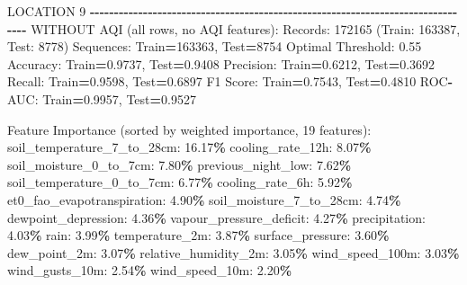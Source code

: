 \documentclass[
  letterpaper,
  DIV=11,
  numbers=noendperiod]{scrartcl}
\newenvironment{Shaded}{\begin{snugshade}}{\end{snugshade}}
\newcommand{\BuiltInTok}[1]{#1}
\newcommand{\DecValTok}[1]{\textcolor[rgb]{0.00,0.00,0.81}{#1}}
\newcommand{\FloatTok}[1]{\textcolor[rgb]{0.00,0.00,0.81}{#1}}
\newcommand{\NormalTok}[1]{#1}
\newcommand{\OperatorTok}[1]{\textcolor[rgb]{0.81,0.36,0.00}{\textbf{#1}}}
\begin{document}
\begin{Shaded}
\begin{Highlighting}[]
\NormalTok{LOCATION }\DecValTok{9}
\OperatorTok{{-}{-}{-}{-}{-}{-}{-}{-}{-}{-}{-}{-}{-}{-}{-}{-}{-}{-}{-}{-}{-}{-}{-}{-}{-}{-}{-}{-}{-}{-}{-}{-}{-}{-}{-}{-}{-}{-}{-}{-}{-}{-}{-}{-}{-}{-}{-}{-}{-}{-}{-}{-}{-}{-}{-}{-}{-}{-}{-}{-}{-}{-}{-}{-}{-}{-}{-}{-}{-}{-}{-}{-}{-}{-}{-}{-}{-}{-}{-}{-}}
\NormalTok{WITHOUT AQI (}\BuiltInTok{all}\NormalTok{ rows, no AQI features):}
\NormalTok{  Records: }\DecValTok{172165}\NormalTok{ (Train: }\DecValTok{163387}\NormalTok{, Test: }\DecValTok{8778}\NormalTok{)}
\NormalTok{  Sequences: Train}\OperatorTok{=}\DecValTok{163363}\NormalTok{, Test}\OperatorTok{=}\DecValTok{8754}
\NormalTok{  Optimal Threshold: }\FloatTok{0.55}
\NormalTok{  Accuracy: Train}\OperatorTok{=}\FloatTok{0.9737}\NormalTok{, Test}\OperatorTok{=}\FloatTok{0.9408}
\NormalTok{  Precision: Train}\OperatorTok{=}\FloatTok{0.6212}\NormalTok{, Test}\OperatorTok{=}\FloatTok{0.3692}
\NormalTok{  Recall: Train}\OperatorTok{=}\FloatTok{0.9598}\NormalTok{, Test}\OperatorTok{=}\FloatTok{0.6897}
\NormalTok{  F1 Score: Train}\OperatorTok{=}\FloatTok{0.7543}\NormalTok{, Test}\OperatorTok{=}\FloatTok{0.4810}
\NormalTok{  ROC}\OperatorTok{{-}}\NormalTok{AUC: Train}\OperatorTok{=}\FloatTok{0.9957}\NormalTok{, Test}\OperatorTok{=}\FloatTok{0.9527}

\NormalTok{  Feature Importance (}\BuiltInTok{sorted}\NormalTok{ by weighted importance, }\DecValTok{19}\NormalTok{ features):}
\NormalTok{    soil\_temperature\_7\_to\_28cm: }\FloatTok{16.17}\OperatorTok{\%}
\NormalTok{    cooling\_rate\_12h: }\FloatTok{8.07}\OperatorTok{\%}
\NormalTok{    soil\_moisture\_0\_to\_7cm: }\FloatTok{7.80}\OperatorTok{\%}
\NormalTok{    previous\_night\_low: }\FloatTok{7.62}\OperatorTok{\%}
\NormalTok{    soil\_temperature\_0\_to\_7cm: }\FloatTok{6.77}\OperatorTok{\%}
\NormalTok{    cooling\_rate\_6h: }\FloatTok{5.92}\OperatorTok{\%}
\NormalTok{    et0\_fao\_evapotranspiration: }\FloatTok{4.90}\OperatorTok{\%}
\NormalTok{    soil\_moisture\_7\_to\_28cm: }\FloatTok{4.74}\OperatorTok{\%}
\NormalTok{    dewpoint\_depression: }\FloatTok{4.36}\OperatorTok{\%}
\NormalTok{    vapour\_pressure\_deficit: }\FloatTok{4.27}\OperatorTok{\%}
\NormalTok{    precipitation: }\FloatTok{4.03}\OperatorTok{\%}
\NormalTok{    rain: }\FloatTok{3.99}\OperatorTok{\%}
\NormalTok{    temperature\_2m: }\FloatTok{3.87}\OperatorTok{\%}
\NormalTok{    surface\_pressure: }\FloatTok{3.60}\OperatorTok{\%}
\NormalTok{    dew\_point\_2m: }\FloatTok{3.07}\OperatorTok{\%}
\NormalTok{    relative\_humidity\_2m: }\FloatTok{3.05}\OperatorTok{\%}
\NormalTok{    wind\_speed\_100m: }\FloatTok{3.03}\OperatorTok{\%}
\NormalTok{    wind\_gusts\_10m: }\FloatTok{2.54}\OperatorTok{\%}
\NormalTok{    wind\_speed\_10m: }\FloatTok{2.20}\OperatorTok{\%}


\end{Highlighting}
\end{Shaded}
\end{document}
